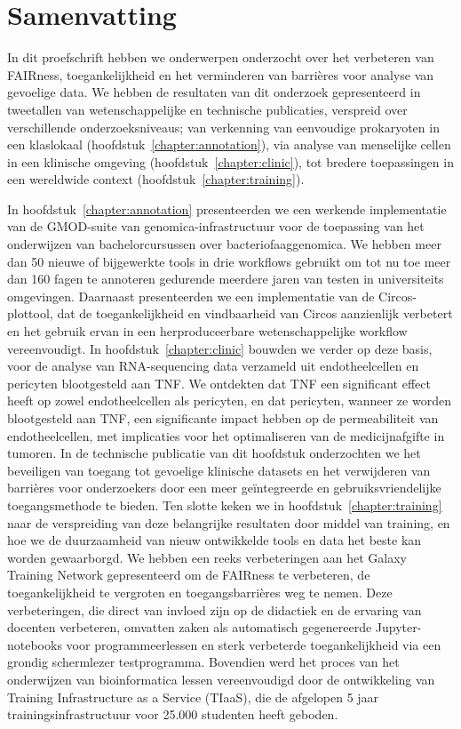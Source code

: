 \chapter{Samenvatting}

In dit proefschrift hebben we onderwerpen onderzocht over het verbeteren van FAIRness, toegankelijkheid en het verminderen van barrières voor analyse van gevoelige data.
We hebben de resultaten van dit onderzoek gepresenteerd in tweetallen van wetenschappelijke en technische publicaties, verspreid over verschillende onderzoeksniveaus; van verkenning van eenvoudige prokaryoten in een klaslokaal (hoofdstuk~\ref{chapter:annotation}), via analyse van menselijke cellen in een klinische omgeving (hoofdstuk~\ref{chapter:clinic}), tot bredere toepassingen in een wereldwide context (hoofdstuk~\ref{chapter:training}).

In hoofdstuk~\ref{chapter:annotation} presenteerden we een werkende implementatie van de GMOD-suite van genomica-infrastructuur voor de toepassing van het onderwijzen van bachelorcursussen over bacteriofaaggenomica.
We hebben meer dan 50 nieuwe of bijgewerkte tools in drie workflows gebruikt om tot nu toe meer dan 160 fagen te annoteren gedurende meerdere jaren van testen in universiteits omgevingen.
Daarnaast presenteerden we een implementatie van de Circos-plottool, dat de toegankelijkheid en vindbaarheid van Circos aanzienlijk verbetert en het gebruik ervan in een herproduceerbare wetenschappelijke workflow vereenvoudigt.
In hoofdstuk~\ref{chapter:clinic} bouwden we verder op deze basis, voor de analyse van RNA-sequencing data verzameld uit endotheelcellen en pericyten blootgesteld aan TNF.
We ontdekten dat TNF een significant effect heeft op zowel endotheelcellen als pericyten, en dat pericyten, wanneer ze worden blootgesteld aan TNF, een significante impact hebben op de permeabiliteit van endotheelcellen, met implicaties voor het optimaliseren van de medicijnafgifte in tumoren.
In de technische publicatie van dit hoofdstuk onderzochten we het beveiligen van toegang tot gevoelige klinische datasets en het verwijderen van barrières voor onderzoekers door een meer geïntegreerde en gebruiksvriendelijke toegangsmethode te bieden.
Ten slotte keken we in hoofdstuk~\ref{chapter:training} naar de verspreiding van deze belangrijke resultaten door middel van training, en hoe we de duurzaamheid van nieuw ontwikkelde tools en data het beste kan worden gewaarborgd.
We hebben een reeks verbeteringen aan het Galaxy Training Network gepresenteerd om de FAIRness te verbeteren, de toegankelijkheid te vergroten en toegangsbarrières weg te nemen.
Deze verbeteringen, die direct van invloed zijn op de didactiek en de ervaring van docenten verbeteren, omvatten zaken als automatisch gegenereerde Jupyter-notebooks voor programmeerlessen en sterk verbeterde toegankelijkheid via een grondig schermlezer testprogramma.
Bovendien werd het proces van het onderwijzen van bioinformatica lessen vereenvoudigd door de ontwikkeling van Training Infrastructure as a Service (TIaaS), die de afgelopen 5 jaar trainingsinfrastructuur voor 25.000 studenten heeft geboden.

